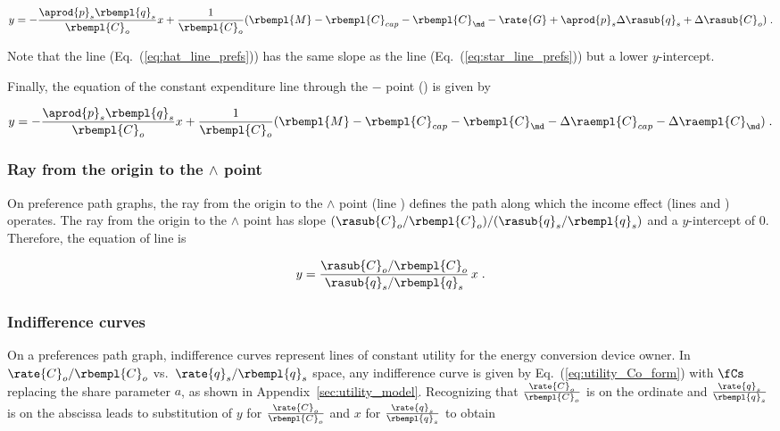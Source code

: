 \begin{equation} \label{eq:hat_line_prefs}
  y = - \frac{\aprod{p}_s \rbempl{q}_s}{\rbempl{C}_o} x
         + \frac{1}{\rbempl{C}_o} (\rbempl{M} - \rbempl{C}_{cap} - \rbempl{C}_{\md} 
                                   - \rate{G} + \aprod{p}_s \Delta \rasub{q}_s + \Delta \rasub{C}_o) \; .
\end{equation}

Note that the \hathat{} line (Eq.~(\ref{eq:hat_line_prefs})) has the same slope as 
the \starstar{} line (Eq.~(\ref{eq:star_line_prefs}))
but a lower $y$-intercept.

Finally, the equation of the constant expenditure line through the 
$-$ point (\barbar{}) is given by

\begin{equation} \label{eq:bar_line_prefs}
  y = - \frac{\aprod{p}_s \rbempl{q}_s}{\rbempl{C}_o} x
        + \frac{1}{\rbempl{C}_o} (\rbempl{M} - \rbempl{C}_{cap} - \rbempl{C}_{\md} 
                                   - \Delta \raempl{C}_{cap} - \Delta \raempl{C}_{\md}) \; .
\end{equation}


\subsubsection{Ray from the origin to the $\wedge$ point} 
\label{sec:pref_graph_ray}

On preference path graphs, 
the ray from the origin to the $\wedge$ point 
(line \rr{})
defines the path along which the income effect
(lines \hatd{} and \dbar{})
operates.
The ray from the origin to the $\wedge$ point
has slope $(\rasub{C}_o/\rbempl{C}_o) / (\rasub{q}_s/\rbempl{q}_s)$
and a $y$-intercept of 0.
Therefore, the equation of line \rr{} is

\begin{equation} \label{eq:ray_prefs}
  y = \frac{\rasub{C}_o/\rbempl{C}_o}{\rasub{q}_s/\rbempl{q}_s} \, x \; .
\end{equation}


\subsubsection{Indifference curves} 
\label{sec:pref_graph_indifference_curves}

On a preferences path graph, 
indifference curves represent lines of constant utility
for the energy conversion device owner.
In $\rate{C}_o/\rbempl{C}_o$ vs.\ $\rate{q}_s/\rbempl{q}_s$ space, 
any indifference curve 
is given by 
Eq.~(\ref{eq:utility_Co_form})
with $\fCs$ replacing the share parameter $a$, 
as shown in Appendix~\ref{sec:utility_model}.
Recognizing that 
$\frac{\rate{C}_o}{\rbempl{C}_o}$ is on the ordinate and 
$\frac{\rate{q}_s}{\rbempl{q}_s}$ is on the abscissa
leads to substitution of 
$y$ for $\frac{\rate{C}_o}{\rbempl{C}_o}$ and 
$x$ for $\frac{\rate{q}_s}{\rbempl{q}_s}$ to obtain

